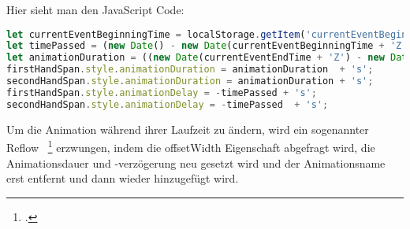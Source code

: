 \newline
\newline
Hier sieht man den JavaScript Code:
\newline
\newline
\begin{lstlisting}[language=javascript,label={lst:JavaScript Timer}]
let currentEventBeginningTime = localStorage.getItem('currentEventBeginningTime');
let timePassed = (new Date() - new Date(currentEventBeginningTime + 'Z')) / 1000;
let animationDuration = ((new Date(currentEventEndTime + 'Z') - new Date(currentEventBeginningTime + 'Z')) / 1000);
firstHandSpan.style.animationDuration = animationDuration  + 's';
secondHandSpan.style.animationDuration = animationDuration + 's';
firstHandSpan.style.animationDelay = -timePassed + 's';
secondHandSpan.style.animationDelay = -timePassed  + 's';
\end{lstlisting}
\newline
\newline
Um die Animation während ihrer Laufzeit zu ändern, wird ein sogenannter Reflow ~\footcite{Reflow} erzwungen, indem die offsetWidth Eigenschaft abgefragt wird, die Animationsdauer und -verzögerung neu gesetzt wird und der Animationsname erst entfernt und dann wieder hinzugefügt wird.
\newline
\newline
